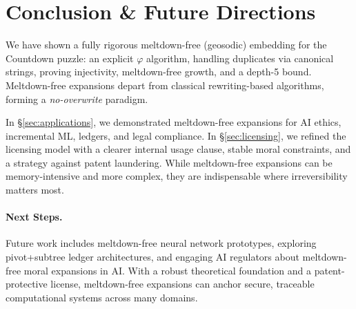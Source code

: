 \documentclass[acmsmall]{acmart}
\theoremstyle{definition}
\theoremstyle{remark}
\begin{document}
\section{Conclusion \& Future Directions}
We have shown a fully rigorous meltdown-free (geosodic) embedding for the Countdown
puzzle: an explicit \(\varphi\) algorithm, handling duplicates via canonical strings,
proving injectivity, meltdown-free growth, and a depth-5 bound. Meltdown-free expansions
depart from classical rewriting-based algorithms, forming a \emph{no-overwrite} paradigm.

In \S\ref{sec:applications}, we demonstrated meltdown-free expansions for AI ethics,
incremental ML, ledgers, and legal compliance. In \S\ref{sec:licensing}, we refined
the licensing model with a clearer internal usage clause, stable moral constraints,
and a strategy against patent laundering. While meltdown-free expansions can be
memory-intensive and more complex, they are indispensable where irreversibility
matters most.

\paragraph{Next Steps.}
Future work includes meltdown-free neural network prototypes, exploring pivot+subtree
ledger architectures, and engaging AI regulators about meltdown-free moral expansions
in AI. With a robust theoretical foundation and a patent-protective license,
meltdown-free expansions can anchor secure, traceable computational systems
across many domains.





\end{document}

